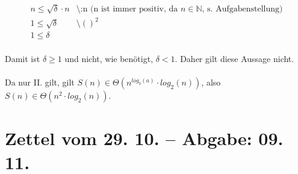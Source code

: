 \documentclass{article}
\begin{document}
\begin{enumerate}
\begin{enumerate}
\[\begin{array}{lll}
    	            n \leq \sqrt{\delta} \cdot n &\text{\textbackslash :n    (n ist immer positiv, da $n \in \mathbb{N}$, s. Aufgabenstellung)}\\
    	            1 \leq \sqrt{\delta} &\text{\textbackslash $()^2$}\\
    	            1 \leq \delta
    	        \end{array}
    	    \]
    	    \\
    	    Damit ist $\delta \geq 1$ und nicht, wie benötigt, $\delta < 1$. Daher gilt diese Aussage nicht.
    	    \\\\
    	    Da nur II. gilt, gilt $S(n) \in \Theta (n^{log_b(a)} \cdot log_2(n))$, also $S(n) \in \Theta (n^2 \cdot log_2(n))$.
    	\end{enumerate}
    \end{enumerate}
\newpage
\section{Zettel vom 29. 10. -- Abgabe: 09. 11.}
\end{document}
